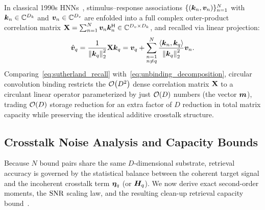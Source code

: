 \begin{remark}\label{rem:sutherland_matrix}
In classical 1990s HNNs~\cite{SUTHERLAND_1990_HNN}, stimulus--response associations $\{(\boldsymbol{k}_n, \boldsymbol{v}_n)\}_{n=1}^N$ with $\boldsymbol{k}_n \in \mathbb{C}^{D_k}$ and $\boldsymbol{v}_n \in \mathbb{C}^{D_v}$ are enfolded into a full complex outer-product correlation matrix $\mathbf{X} = \sum_{n=1}^{N} \boldsymbol{v}_n \boldsymbol{k}_n^{\mathsf{H}} \in \mathbb{C}^{D_v \times D_k}$, and recalled via linear projection:
\begin{equation}\label{eq:sutherland_recall}
    \hat{\boldsymbol{v}}_q = \frac{1}{\left\lVert \boldsymbol{k}_q \right\rVert_2^2} \mathbf{X} \boldsymbol{k}_q
    = \boldsymbol{v}_q + \sum_{\substack{n=1 \\ n \neq q}}^{N} \frac{\left\langle \boldsymbol{k}_n, \boldsymbol{k}_q \right\rangle}{\left\lVert \boldsymbol{k}_q \right\rVert_2^2} \boldsymbol{v}_n.
\end{equation}
Comparing~\eqref{eq:sutherland_recall} with~\eqref{eq:unbinding_decomposition}, circular convolution binding restricts the $\mathcal{O}\!\left(D^2\right)$ dense correlation matrix $\mathbf{X}$ to a circulant linear operator parameterized by just $\mathcal{O}\!\left(D\right)$ numbers (the vector $\boldsymbol{m}$), trading $\mathcal{O}\!\left(D\right)$ storage reduction for an extra factor of $D$ reduction in total matrix capacity while preserving the identical additive crosstalk structure.
\end{remark}

\subsection{Crosstalk Noise Analysis and Capacity Bounds}\label{sec:math:capacity}

Because $N$ bound pairs share the same $D$-dimensional substrate, retrieval accuracy is governed by the statistical balance between the coherent target signal and the incoherent crosstalk term $\boldsymbol{\eta}_q$ (or $\boldsymbol{H}_q$).
We now derive exact second-order moments, the $\mathrm{SNR}$ scaling law, and the resulting clean-up retrieval capacity bound~\cite{PLATE_1995_HRR,FRADY_CAPACITY_VSA}.

